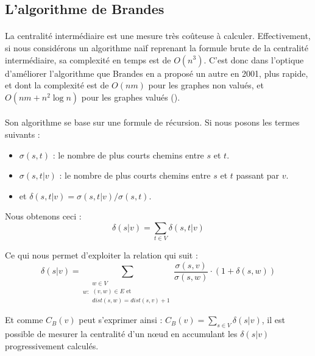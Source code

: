 \documentclass[a4paper, 10pt]{report}
\begin{document}
		\subsection{L'algorithme de Brandes}

% 
% 
\paragraph{}La centralité intermédiaire est une mesure très coûteuse à calculer. Effectivement, si nous considérons un algorithme naïf reprenant la formule brute de la centralité intermédiaire, sa complexité en temps est de $O(n^3)$. C'est donc dans l'optique d'améliorer l'algorithme que Brandes en a proposé un autre en 2001, plus rapide, et dont la complexité est de $O(nm)$ pour les graphes non valués, et $O(nm+n^2\log n)$ pour les graphes valués (\cite{Brandes2001Faster}).

\paragraph{}Son algorithme se base sur une formule de récursion. Si nous posons les termes suivants :
\begin{itemize}
    \item $\sigma (s, t)$ : le nombre de plus courts chemins entre $s$ et $t$.
    \item $\sigma (s, t | v)$ : le nombre de plus courts chemins entre $s$ et $t$ passant par $v$.
    \item et $\delta (s, t | v)=\sigma (s, t | v)/\sigma (s, t)$.
\end{itemize}

Nous obtenons ceci :
$$
\delta(s|v) =\sum_{t\in V}\delta(s, t | v)
$$

Ce qui nous permet d'exploiter la relation qui suit :
$$
\delta(s|v)=\sum_{w:\substack{w \in V\\(v, w)\in E \text{ et }\\dist(s, w)=dist(s, v)+1}}\frac{\sigma(s, v)}{\sigma(s, w)}\cdot(1+ \delta(s, w))
$$

Et comme $C_B(v)$ peut s'exprimer ainsi : $C_B(v)=\sum_{s\in V}\delta(s|v)$, il est possible de mesurer la centralité d'un n\oe ud en accumulant les $\delta(s|v)$ progressivement calculés.
\end{document}

